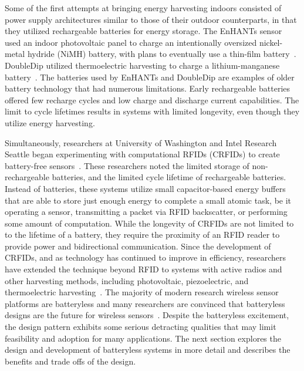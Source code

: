 Some of the first attempts at bringing energy harvesting indoors consisted of power supply architectures similar to those of their outdoor counterparts, in that they utilized rechargeable batteries for energy storage.
The EnHANTs sensor used an indoor photovoltaic panel to charge an intentionally oversized nickel-metal hydride (NiMH)
battery, with plans to eventually use a thin-film battery~\cite{gorlatova2009challenge,margolies2015energy}.
DoubleDip utilized thermoelectric harvesting to charge a lithium-manganese battery~\cite{martin2012doubledip}.
The batteries used by EnHANTs and DoubleDip are examples of older battery technology that had numerous limitations. Early rechargeable batteries offered few recharge cycles and low charge and discharge current capabilities.
The limit to cycle lifetimes results in systems with limited longevity, even though they utilize energy harvesting.

Simultaneously, researchers at University of Washington and Intel Research Seattle began experimenting with computational RFIDs (CRFIDs) to create battery-free sensors~\cite{sample2008design}. 
These researchers noted the limited storage of non-rechargeable batteries, and the limited cycle lifetime of rechargeable batteries. 
Instead of batteries, these systems utilize small capacitor-based energy buffers that are able to store just enough energy to complete a small atomic task, be it operating a sensor, transmitting a packet via RFID backscatter, or performing some amount of computation. 
While the longevity of CRFIDs are not limited to to the lifetime of a battery, they require the proximity of an RFID reader to provide power and bidirectional communication. 
Since the development of CRFIDs, and as technology has continued to improve in efficiency, researchers have extended the technique beyond RFID to systems with active radios and other harvesting methods, including photovoltaic, piezoelectric, and thermoelectric harvesting~\cite{yervaGrafting12, debruin2013monjolo, hesterFlicker17, colinReconfigurable18, nardello2019camaroptera}. 
The majority of modern research wireless sensor platforms are batteryless and many researchers are convinced that batteryless designs are the future for wireless sensors~\cite{hester2017future}.
Despite the batteryless excitement, the design pattern exhibits some serious detracting qualities that may limit feasibility and adoption for many applications.
The next section explores the design and development of batteryless systems in more detail and describes the benefits and trade offs of the design.

